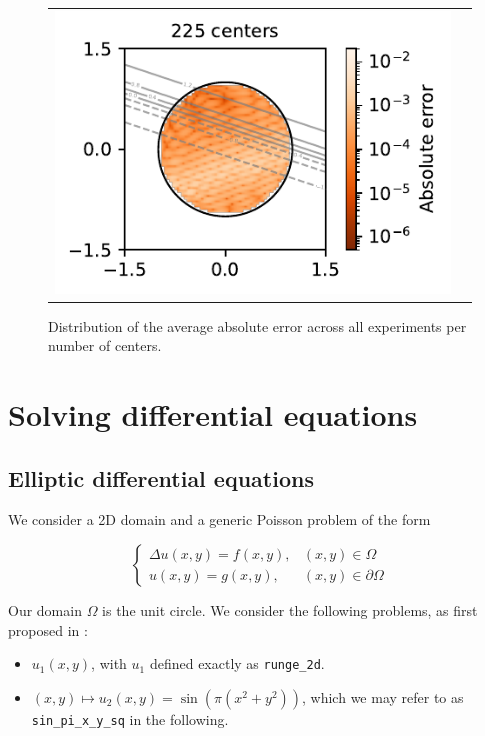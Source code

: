 \documentclass[12pt]{report} %
\newcommand{\mathLaplace}{\Delta}
\begin{document}
\begin{figure}
\begin{tabular}{ccl}
    \multicolumn{2}{l}{\includegraphics[width=.4\textwidth, clip=true,trim={0 0 2.1cm 0}]{imagenes/experiments/2d/statistical_2d_full_scheduler_interpolation/arctan_2d/arctan_paper_2d_225.pdf}} &
  \end{tabular}
  \caption{Distribution of the average absolute error across all experiments per number of centers.}
  \label{fig:arctan-2d-results-errors-avg}
\end{figure}

\clearpage
\section{Solving differential equations}

\subsection*{Elliptic differential equations}

We consider a 2D domain and a generic Poisson problem of the form

\begin{equation}
  \left\{\begin{array}{ll}
    \mathLaplace u (x, y) = f (x, y), & (x, y) \in \Omega          \\
    u (x, y) = g (x, y),              & (x, y) \in \partial \Omega
  \end{array}\right. \label{eqn:poisson}
\end{equation}

Our domain $\Omega$ is the unit circle. We consider the following problems, as first proposed in \cite{larsson2003numerical}:

\begin{itemize}
  \item $u_1(x,y)$, with $u_1$ defined exactly as \texttt{runge\_2d}.
  \item $(x,y) \mapsto u_2(x,y)=\sin(\pi(x^2+y^2))$, which we may refer to as \texttt{sin\_pi\_x\_y\_sq} in the following.
\end{itemize}

\end{document}
